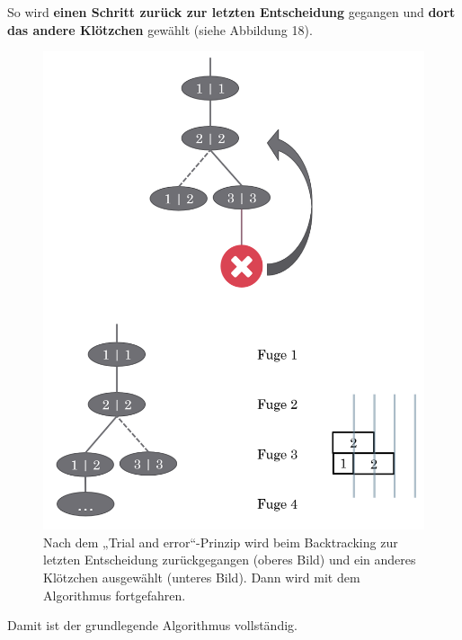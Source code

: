 \documentclass[a4paper,12pt]{article}
\begin{document}
So wird \textbf{einen Schritt zurück zur letzten Entscheidung} gegangen und \textbf{dort das andere Klötzchen} gewählt (siehe Abbildung 18).
\begin{figure}[H]
    \centering
    \includegraphics[width=1\linewidth]{Bilder/Aufgabe1/Backtracking_03_04.png}
    \caption{Nach dem „Trial and error“-Prinzip wird beim Backtracking zur letzten Entscheidung zurückgegangen (oberes Bild) und ein anderes Klötzchen ausgewählt (unteres Bild). Dann wird mit dem Algorithmus fortgefahren.}
\end{figure}

Damit ist der grundlegende Algorithmus vollständig.
\end{document}
